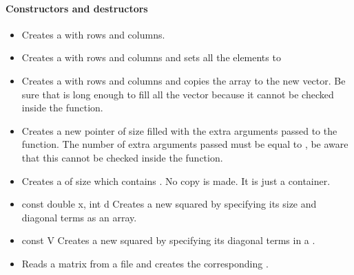 \paragraph{Constructors and destructors}
\begin{itemize}
\item {}
  \sshortdescribe Creates a   with  rows and  columns.

\item {}
  \sshortdescribe Creates a  with  rows and 
  columns and sets all the elements to 

\item {}
  \sshortdescribe Creates a  with  rows and 
  columns and copies the array  to the new vector. Be sure that 
  is long enough to fill all the vector because it cannot be checked inside the function.

\item {}
  \sshortdescribe Creates a new  pointer of size  filled with the extra arguments passed to the function. The
  number of extra arguments passed must be equal to , be
  aware that this cannot be checked inside the function.

\item {}
    \sshortdescribe Creates a  of size  
    which contains . No copy is made. It is just a container.
  
\item {}
  {const double \ptr x, int d}
  \sshortdescribe Creates a new squared  by specifying its size and
  diagonal terms as an array.

\item {}
  {const  \ptr V}
  \sshortdescribe Creates a new squared  by specifying its diagonal
  terms in a .

\item {}
  \sshortdescribe Reads a matrix from a file and creates the corresponding .  


\end{itemize}
